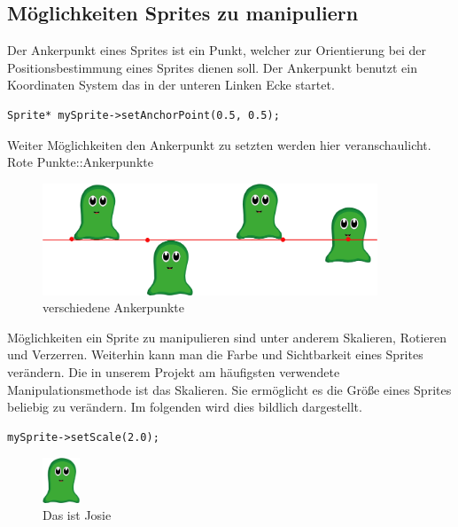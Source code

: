 \subsection{Möglichkeiten Sprites zu manipuliern}
Der Ankerpunkt eines Sprites ist ein Punkt, welcher zur Orientierung bei der Positionsbestimmung eines Sprites dienen soll. Der Ankerpunkt benutzt ein Koordinaten System das in der unteren Linken Ecke startet. 

\begin{lstlisting}[style=singleline]
Sprite* mySprite->setAnchorPoint(0.5, 0.5);
\end{lstlisting}


Weiter Möglichkeiten den Ankerpunkt zu setzten werden hier veranschaulicht. Rote Punkte::Ankerpunkte

\begin{figure}[H]
  \centering
  \includegraphics[width=10cm]{resources/josiedoku3}
  \caption{verschiedene Ankerpunkte}
  \label{fig:josie_ancherpoint} 
\end{figure}

Möglichkeiten ein Sprite zu manipulieren sind unter anderem Skalieren, Rotieren und Verzerren. Weiterhin kann man die Farbe und Sichtbarkeit eines Sprites verändern. Die in unserem Projekt am häufigsten verwendete Manipulationsmethode ist das Skalieren. Sie ermöglicht es die Größe eines Sprites beliebig zu verändern. Im folgenden wird dies bildlich dargestellt. 

\begin{lstlisting}[style=singleline]
mySprite->setScale(2.0);
\end{lstlisting}



\begin{figure}[H]
 \centering
  \includegraphics[width=0.1\textwidth]{resources/josie}
  \caption{Das ist Josie}
  \label{fig:josie} 
\end{figure}



